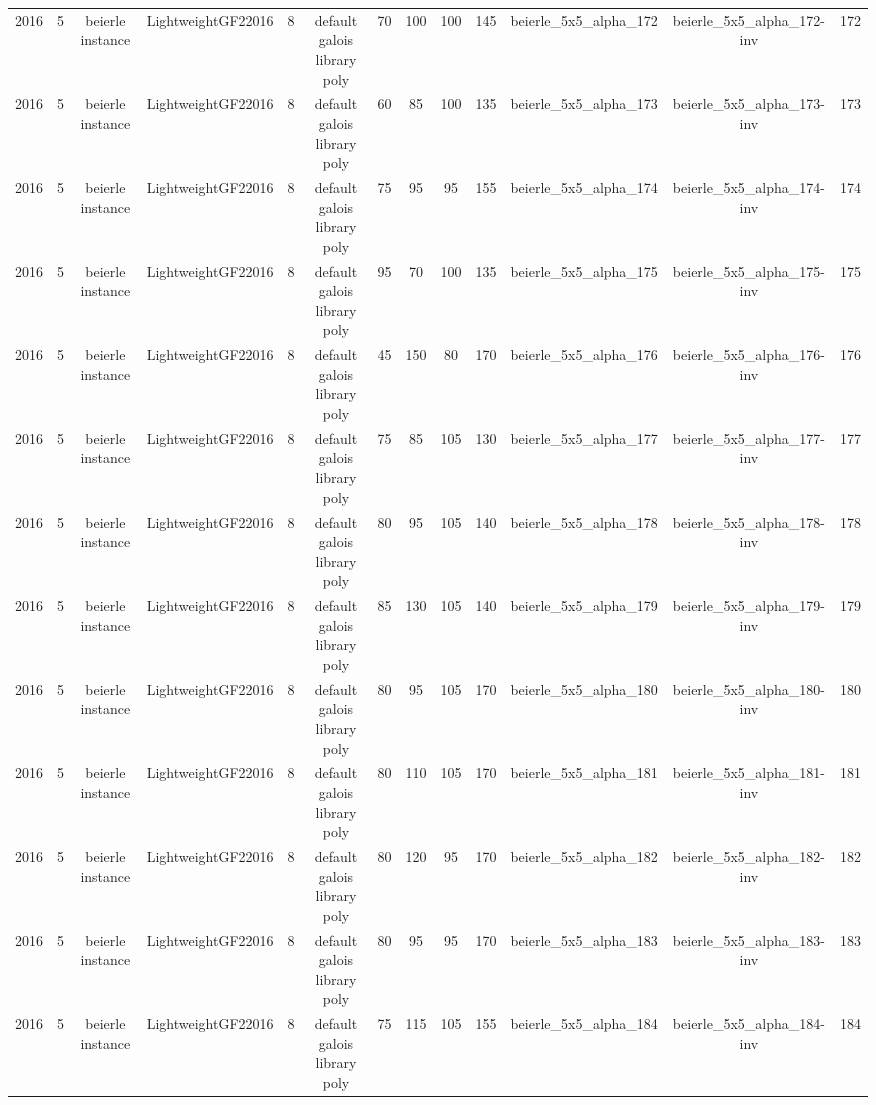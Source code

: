 \begin{tabular}{c c c c c c c c c c c c c}
2016 & 5 & beierle instance & LightweightGF22016 & 8 & default galois library poly & 70 & 100 & 100 & 145 & beierle_5x5_alpha_172 & beierle_5x5_alpha_172-inv & 172 \\
2016 & 5 & beierle instance & LightweightGF22016 & 8 & default galois library poly & 60 & 85 & 100 & 135 & beierle_5x5_alpha_173 & beierle_5x5_alpha_173-inv & 173 \\
2016 & 5 & beierle instance & LightweightGF22016 & 8 & default galois library poly & 75 & 95 & 95 & 155 & beierle_5x5_alpha_174 & beierle_5x5_alpha_174-inv & 174 \\
2016 & 5 & beierle instance & LightweightGF22016 & 8 & default galois library poly & 95 & 70 & 100 & 135 & beierle_5x5_alpha_175 & beierle_5x5_alpha_175-inv & 175 \\
2016 & 5 & beierle instance & LightweightGF22016 & 8 & default galois library poly & 45 & 150 & 80 & 170 & beierle_5x5_alpha_176 & beierle_5x5_alpha_176-inv & 176 \\
2016 & 5 & beierle instance & LightweightGF22016 & 8 & default galois library poly & 75 & 85 & 105 & 130 & beierle_5x5_alpha_177 & beierle_5x5_alpha_177-inv & 177 \\
2016 & 5 & beierle instance & LightweightGF22016 & 8 & default galois library poly & 80 & 95 & 105 & 140 & beierle_5x5_alpha_178 & beierle_5x5_alpha_178-inv & 178 \\
2016 & 5 & beierle instance & LightweightGF22016 & 8 & default galois library poly & 85 & 130 & 105 & 140 & beierle_5x5_alpha_179 & beierle_5x5_alpha_179-inv & 179 \\
2016 & 5 & beierle instance & LightweightGF22016 & 8 & default galois library poly & 80 & 95 & 105 & 170 & beierle_5x5_alpha_180 & beierle_5x5_alpha_180-inv & 180 \\
2016 & 5 & beierle instance & LightweightGF22016 & 8 & default galois library poly & 80 & 110 & 105 & 170 & beierle_5x5_alpha_181 & beierle_5x5_alpha_181-inv & 181 \\
2016 & 5 & beierle instance & LightweightGF22016 & 8 & default galois library poly & 80 & 120 & 95 & 170 & beierle_5x5_alpha_182 & beierle_5x5_alpha_182-inv & 182 \\
2016 & 5 & beierle instance & LightweightGF22016 & 8 & default galois library poly & 80 & 95 & 95 & 170 & beierle_5x5_alpha_183 & beierle_5x5_alpha_183-inv & 183 \\
2016 & 5 & beierle instance & LightweightGF22016 & 8 & default galois library poly & 75 & 115 & 105 & 155 & beierle_5x5_alpha_184 & beierle_5x5_alpha_184-inv & 184 \\

\end{tabular}
